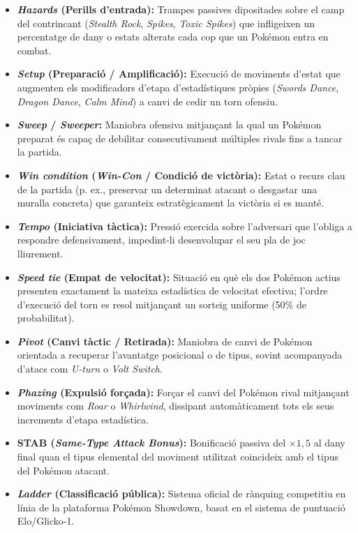 \begin{itemize}
    \item \textbf{\emph{Hazards} (Perills d'entrada):} Trampes passives dipositades sobre el camp del contrincant (\emph{Stealth Rock}, \emph{Spikes}, \emph{Toxic Spikes}) que infligeixen un percentatge de dany o estats alterats cada cop que un Pokémon entra en combat.
    \item \textbf{\emph{Setup} (Preparació / Amplificació):} Execució de moviments d'estat que augmenten els modificadors d'etapa d'estadístiques pròpies (\emph{Swords Dance}, \emph{Dragon Dance}, \emph{Calm Mind}) a canvi de cedir un torn ofensiu.
    \item \textbf{\emph{Sweep} / \emph{Sweeper}:} Maniobra ofensiva mitjançant la qual un Pokémon preparat és capaç de debilitar consecutivament múltiples rivals fins a tancar la partida.
    \item \textbf{\emph{Win condition} (\emph{Win-Con} / Condició de victòria):} Estat o recurs clau de la partida (p. ex., preservar un determinat atacant o desgastar una muralla concreta) que garanteix estratègicament la victòria si es manté.
    \item \textbf{\emph{Tempo} (Iniciativa tàctica):} Pressió exercida sobre l'adversari que l'obliga a respondre defensivament, impedint-li desenvolupar el seu pla de joc lliurement.
    \item \textbf{\emph{Speed tie} (Empat de velocitat):} Situació en què els dos Pokémon actius presenten exactament la mateixa estadística de velocitat efectiva; l'ordre d'execució del torn es resol mitjançant un sorteig uniforme (50\% de probabilitat).
    \item \textbf{\emph{Pivot} (Canvi tàctic / Retirada):} Maniobra de canvi de Pokémon orientada a recuperar l'avantatge posicional o de tipus, sovint acompanyada d'atacs com \emph{U-turn} o \emph{Volt Switch}.
    \item \textbf{\emph{Phazing} (Expulsió forçada):} Forçar el canvi del Pokémon rival mitjançant moviments com \emph{Roar} o \emph{Whirlwind}, dissipant automàticament tots els seus increments d'etapa estadística.
    \item \textbf{STAB (\emph{Same-Type Attack Bonus}):} Bonificació passiva del $\times 1{,}5$ al dany final quan el tipus elemental del moviment utilitzat coincideix amb el tipus del Pokémon atacant.
    \item \textbf{\emph{Ladder} (Classificació pública):} Sistema oficial de rànquing competitiu en línia de la plataforma Pokémon Showdown, basat en el sistema de puntuació Elo/Glicko-1.
\end{itemize}

